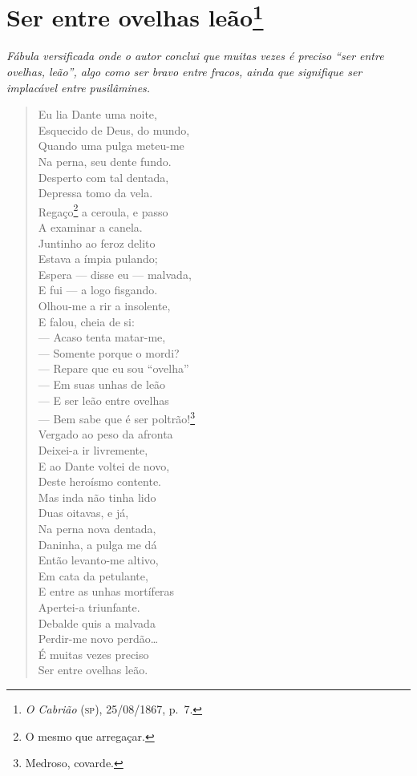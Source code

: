 \chapter{Ser entre ovelhas leão\footnote{
\emph{O Cabrião} (\textsc{sp}), 25/08/1867, p.~7.}}

\begin{didascalia}
\emph{Fábula versificada onde o autor conclui que muitas vezes é preciso
``ser entre ovelhas, leão'', algo como ser bravo entre fracos, ainda que
signifique ser implacável entre pusilâmines.}
\end{didascalia}


\begin{verse}
Eu lia Dante uma noite,\\
Esquecido de Deus, do mundo,\\
Quando uma pulga meteu-me\\
Na perna, seu dente fundo.\\
Desperto com tal dentada,\\
Depressa tomo da vela.\\
Regaço\footnote{ O mesmo que arregaçar.} a ceroula, e passo\\
A examinar a canela.\\
Juntinho ao feroz delito\\
Estava a ímpia pulando;\\
Espera --- disse eu --- malvada,\\
E fui --- a logo fisgando.\\
Olhou-me a rir a insolente,\\
E falou, cheia de si:\\
--- Acaso tenta matar-me,\\
--- Somente porque o mordi?\\
--- Repare que eu sou ``ovelha''\\
--- Em suas unhas de leão\\
--- E ser leão entre ovelhas\\
--- Bem sabe que é ser poltrão!\footnote{ Medroso, covarde.}\\
Vergado ao peso da afronta\\
Deixei-a ir livremente,\\
E ao Dante voltei de novo,\\
Deste heroísmo contente.\\
Mas inda não tinha lido\\
Duas oitavas, e já,\\
Na perna nova dentada,\\
Daninha, a pulga me dá\\
Então levanto-me altivo,\\
Em cata da petulante,\\
E entre as unhas mortíferas\\
Apertei-a triunfante.\\
Debalde quis a malvada\\
Perdir-me novo perdão\ldots{}\\ %
É muitas vezes preciso\\
Ser entre ovelhas leão.
\end{verse}

